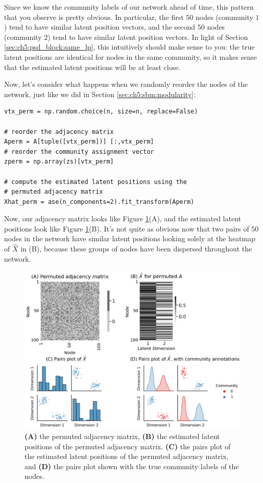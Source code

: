 Since we know the community labels of our network ahead of time, this pattern that you observe is pretty obvious. In particular, the first $50$ nodes (community $1$) tend to have similar latent position vectors, and the second $50$ nodes (community $2$) tend to have similar latent position vectors. In light of Section \ref{sec:ch5:psd_block:same_lp}, this intuitively should make sense to you: the true latent positions are {identical} for nodes in the same community, so it makes sense that the estimated latent positions will be at least close.

Now, let's consider what happens when we randomly reorder the nodes of the network, just like we did in Section \ref{sec:ch5:sbm:modularity}:

\begin{lstlisting}[style=python]
vtx_perm = np.random.choice(n, size=n, replace=False)

# reorder the adjacency matrix
Aperm = A[tuple([vtx_perm])] [:,vtx_perm]
# reorder the community assignment vector
zperm = np.array(zs)[vtx_perm]

# compute the estimated latent positions using the
# permuted adjacency matrix
Xhat_perm = ase(n_components=2).fit_transform(Aperm)
\end{lstlisting}
Now, our adjacency matrix looks like Figure \ref{fig:ch6:ase:ase_permuted}(A), and the estimated latent positions look like Figure \ref{fig:ch6:ase:ase_permuted}(B). It's not quite as obvious now that two pairs of $50$ nodes in the network have similar latent positions looking solely at the heatmap of $\hat X$ in (B), because these groups of nodes have been dispersed throughout the network. 

\begin{figure}
    \centering
    \includegraphics[width=\linewidth]{representations/ch6/Images/ase_permuted.png}
    \caption[ASE recovers latent structure, permutation-agnostic]{\textbf{(A)} the permuted adjacency matrix, \textbf{(B)} the estimated latent positions of the permuted adjacency matrix. \textbf{(C)} the pairs plot of the estimated latent positions of the permuted adjacency matrix, and \textbf{(D)} the pairs plot shown with the true community labels of the nodes.}
    \label{fig:ch6:ase:ase_permuted}
\end{figure}

